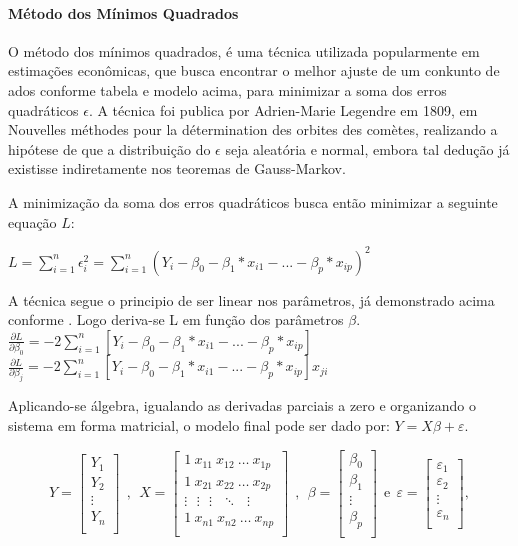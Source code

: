 \documentclass[	12pt, Times, openright, twoside, a4paper, english, brazil]{abntex2}
\begin{document}
          \paragraph{Método dos Mínimos Quadrados}
          O método dos mínimos quadrados, é uma técnica utilizada popularmente em estimações econômicas, que busca encontrar o melhor ajuste de um conkunto de ados conforme tabela e modelo acima, para minimizar a soma dos erros quadráticos $\epsilon$. A técnica foi publica por Adrien-Marie Legendre em 1809, em Nouvelles méthodes pour la détermination des orbites des comètes, realizando a hipótese de que a distribuição do $\epsilon$ seja aleatória e normal, embora tal dedução já existisse indiretamente nos teoremas de Gauss-Markov.
          
          A minimização da soma dos erros quadráticos busca então minimizar a seguinte equação $L$:
          
          $L = \sum_{i=1}^{n} \epsilon_i^2 = \sum_{i=1}^{n}(Y_i-\beta_0-\beta_1*x_{i1}-...-\beta_p*x_{ip})^2$
          
           A técnica segue o principio de ser linear nos parâmetros, já demonstrado acima conforme \cite{Clarice2011}.
           Logo deriva-se L em função dos parâmetros $\beta$.\\
           $\frac {\partial L}{\partial \beta_0} = -2 \sum_{i=1}^{n}[Y_i-\beta_0-\beta_1*x_{i1}-...-\beta_p*x_{ip}]$\\
           $\frac {\partial L}{\partial \beta_j} = -2 \sum_{i=1}^{n}[Y_i-\beta_0-\beta_1*x_{i1}-...-\beta_p*x_{ip}]x_{ji}$
          
          Aplicando-se álgebra, igualando as derivadas parciais a zero e organizando o sistema em forma matricial, o modelo final pode ser dado por: $Y=X\beta+\varepsilon$.
          
          $$Y=\left[\begin{array}{c}Y_1\\Y_2\\\vdots\\Y_n\\\end{array} \right]~~,~~X=\left[\begin{array}{ccccc}1~x_{11}~ x_{12}~\ldots~x_{1p}\\1~x_{21}~x_{22}~\ldots~x_{2p}\\\vdots~~~\vdots~~~\vdots~~~\ddots~~~\vdots\\1~x_{n1}~x_{n2}~\ldots~x_{np}\\\end{array} \right]~~,~~\beta=\left[ \begin{array}{c}\beta_0\\\beta_1\\\vdots\\\beta_p\\\end{array} \right]~~\mbox{e}~~ \varepsilon=\left[ \begin{array}{c}\varepsilon_1\\\varepsilon_2\\\vdots\\\varepsilon_n\\\end{array}\right],$$
          
\end{document}
